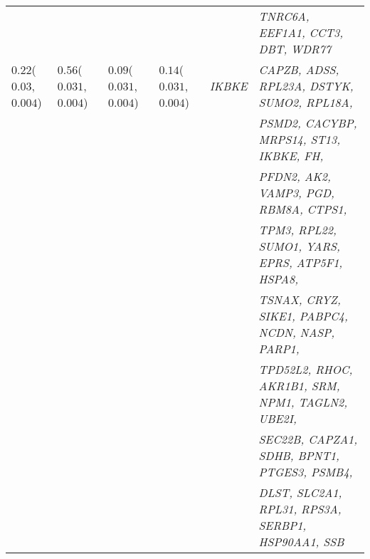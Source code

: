 \documentclass[10pt]{article}
\begin{document}
\begin{landscape}
\begin{table}[!htbp]
{\begin{tabular}{l l l l |l l}
&&&&&\textit{TNRC6A, EEF1A1, CCT3, DBT, WDR77} \\[2pt]
$0.22$($0.03$, $0.004$) & $0.56$($0.031$, $0.004$) & $0.09$($0.031$, $0.004$) & $0.14$($0.031$, $0.004$) & \textit{IKBKE} & \textit{CAPZB, ADSS, RPL23A, DSTYK, SUMO2, RPL18A,} \\[2pt] 
&&&&&\textit{PSMD2, CACYBP, MRPS14, ST13, IKBKE, FH,} \\[2pt]
&&&&&\textit{PFDN2, AK2, VAMP3, PGD, RBM8A, CTPS1,} \\[2pt]
&&&&&\textit{TPM3, RPL22, SUMO1, YARS, EPRS, ATP5F1, HSPA8,} \\[2pt]
&&&&&\textit{TSNAX, CRYZ, SIKE1, PABPC4, NCDN, NASP, PARP1,} \\[2pt]
&&&&&\textit{TPD52L2, RHOC, AKR1B1, SRM, NPM1, TAGLN2, UBE2I,} \\[2pt]
&&&&&\textit{SEC22B, CAPZA1, SDHB, BPNT1, PTGES3, PSMB4,} \\[2pt]
&&&&&\textit{DLST, SLC2A1, RPL31, RPS3A, SERBP1, HSP90AA1, SSB} \\[1.5pt] \hline\hline

\end{tabular}}
\label{tab:pathSIM1}
\end{table}
\end{landscape}
\end{document}
